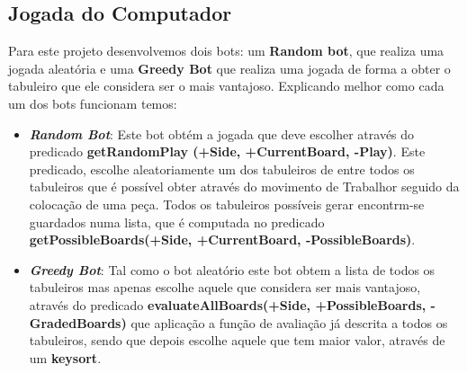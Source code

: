\documentclass[a4paper]{article}
\begin{document}
\newpage

\subsection{Jogada do Computador}
Para este projeto desenvolvemos dois bots:  um \textbf {Random bot}, que realiza uma jogada aleatória e uma \textbf{Greedy Bot} que realiza uma jogada de forma a obter o tabuleiro que ele considera ser o mais vantajoso. Explicando melhor como cada um dos bots funcionam temos:
\begin{itemize}
 	\item \textbf{\textit{Random Bot}}: Este bot obtém a jogada que deve escolher através do predicado \textbf{getRandomPlay (+Side, +CurrentBoard, -Play)}. Este predicado, escolhe aleatoriamente um dos tabuleiros de entre todos os tabuleiros que é possível obter através do movimento de Trabalhor seguido da colocação de uma peça. Todos os tabuleiros possíveis gerar encontrm-se guardados numa lista, que é computada no predicado \textbf{getPossibleBoards(+Side, +CurrentBoard, -PossibleBoards)}.
	\item\textbf{\textit{Greedy Bot}}: Tal como o bot aleatório este bot obtem a lista de todos os tabuleiros mas apenas escolhe aquele que considera ser mais vantajoso, através do predicado \textbf{evaluateAllBoards(+Side, +PossibleBoards, -GradedBoards)} que aplicação a função de avaliação já descrita a todos os tabuleiros, sendo que depois escolhe aquele que tem maior valor, através de um \textbf{keysort}.
\end{itemize}

\newpage
\end{document}
